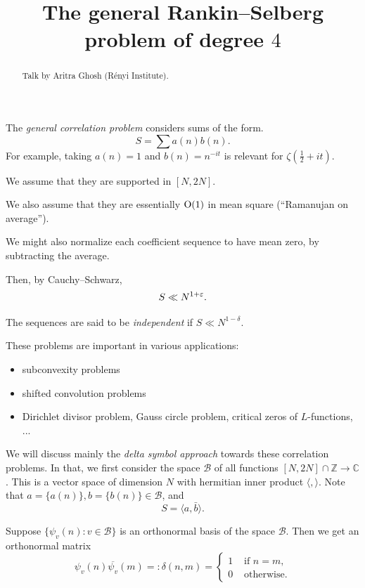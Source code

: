 \documentclass[reqno]{amsart} 
\begin{document}
\title{The general Rankin--Selberg problem of degree $4$}

\begin{abstract}
  Talk by Aritra Ghosh (R\'enyi Institute).
\end{abstract}



The \emph{general correlation problem} considers sums of the form.
\begin{equation*}
  S = \sum a(n) b(n).
\end{equation*}
For example, taking $a(n) = 1$ and $b(n) = n^{- i t}$ is relevant for $\zeta(\tfrac{1}{2} + i t)$.

We assume that they are supported in $[N, 2 N]$.

We also assume that they are essentially $\operatorname{O}(1)$ in mean square (``Ramanujan on average'').

We might also normalize each coefficient sequence to have mean zero, by subtracting the average.

Then, by Cauchy--Schwarz,
\begin{equation*}
  S \ll N^{1 + \varepsilon}.
\end{equation*}

The sequences are said to be \emph{independent} if $S \ll N^{1 - \delta}$.

These problems are important in various applications:
\begin{itemize}
\item subconvexity problems
\item shifted convolution problems
\item Dirichlet divisor problem, Gauss circle problem, critical zeros of $L$-functions, ...
\end{itemize}

We will discuss mainly the \emph{delta symbol approach} towards these correlation problems.  In that, we first consider the space $\mathcal{B}$ of all functions $[N, 2 N] \cap \mathbb{Z} \rightarrow \mathbb{C}$.  This is a vector space of dimension $N$ with hermitian inner product $\langle , \rangle$.  Note that $a = \{a(n)\}, b = \{b(n)\} \in \mathcal{B}$, and
\begin{equation}\label{eq:cqy4xpyll4}
  S = \langle a, \bar{b} \rangle.
\end{equation}

Suppose $\{\psi_v(n) : v \in \mathcal{B}\}$ is an orthonormal basis of the space $\mathcal{B}$.  Then we get an orthonormal matrix
\begin{equation*}
  \psi_v(n) \overline{\psi_v}(m) =: \delta(n, m)
  =
  \begin{cases}
    1    & \text{ if } n = m, \\
    0         & \text{ otherwise}.
  \end{cases}
\end{equation*}
\end{document}
